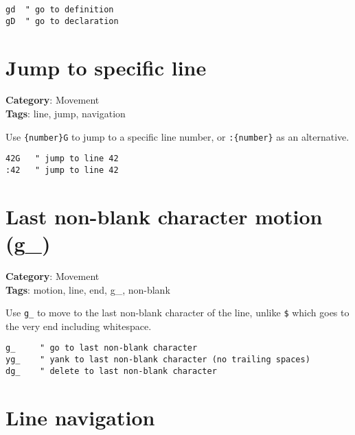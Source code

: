 {{{{{{\begin{Exa*}{}
\begin{Verbatim}[fontsize=\footnotesize, breaklines, breakanywhere]
gd  " go to definition
gD  " go to declaration
\end{Verbatim}
\end{Exa*}

\section{Jump to specific line}

\textbf{Category}: Movement\\ \textbf{Tags}: line, jump, navigation
\vspace{0.5cm}

Use {\footnotesize \Verb§{number}G§} to jump to a specific line number, or {\footnotesize \Verb§:{number}§} as an alternative.

\begin{Exa*}{}
\begin{Verbatim}[fontsize=\footnotesize, breaklines, breakanywhere]
42G   " jump to line 42
:42   " jump to line 42
\end{Verbatim}
\end{Exa*}

\section{Last non-blank character motion (g\_)}

\textbf{Category}: Movement\\ \textbf{Tags}: motion, line, end, g\_, non-blank
\vspace{0.5cm}

Use {\footnotesize \Verb§g_§} to move to the last non-blank character of the line, unlike {\footnotesize \Verb§$§} which goes to the very end including whitespace.

\begin{Exa*}{}
\begin{Verbatim}[fontsize=\footnotesize, breaklines, breakanywhere]
g_     " go to last non-blank character
yg_    " yank to last non-blank character (no trailing spaces)
dg_    " delete to last non-blank character
\end{Verbatim}
\end{Exa*}

\section{Line navigation}

}}}}}}

